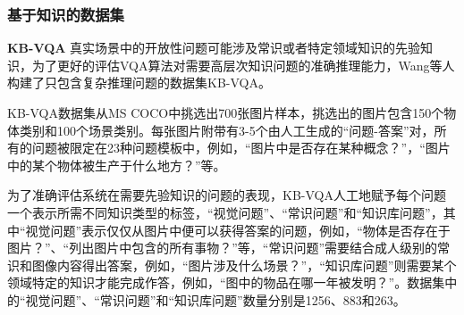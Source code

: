 \subsubsection{基于知识的数据集}
\textbf{KB-VQA}\qquad
真实场景中的开放性问题可能涉及常识或者特定领域知识的先验知识，为了更好的评估VQA算法对需要高层次知识问题的准确推理能力，Wang等人构建了只包含复杂推理问题的数据集KB-VQA。

KB-VQA数据集从MS COCO中挑选出700张图片样本，挑选出的图片包含150个物体类别和100个场景类别。每张图片附带有3-5个由人工生成的“问题-答案”对，所有的问题被限定在23种问题模板中，例如，“图片中是否存在某种概念？”，“图片中的某个物体被生产于什么地方？”等。

为了准确评估系统在需要先验知识的问题的表现，KB-VQA人工地赋予每个问题一个表示所需不同知识类型的标签，“视觉问题”、“常识问题”和“知识库问题”，其中“视觉问题”表示仅仅从图片中便可以获得答案的问题，例如，“物体是否存在于图片？”、“列出图片中包含的所有事物？”等，“常识问题”需要结合成人级别的常识和图像内容得出答案，例如，“图片涉及什么场景？”，“知识库问题”则需要某个领域特定的知识才能完成作答，例如，“图中的物品在哪一年被发明？”。数据集中的“视觉问题”、“常识问题”和“知识库问题”数量分别是1256、883和263。



